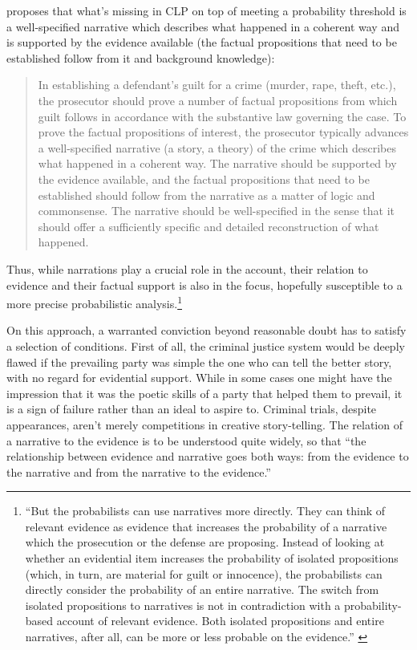 \documentclass[10pt,leqno]{article}
\begin{document}
 \citet{di2013statistics}  proposes that what's  missing in CLP on top of meeting a probability threshold is a well-specified narrative  which describes what happened in a coherent way and is supported by the evidence available (the factual propositions that need to be established follow from it and background knowledge): 
 \begin{quote}
 In establishing a defendant's guilt for a crime (murder, rape, theft, etc.), the prosecutor should prove a number of factual propositions from which guilt follows in accordance with the substantive law governing the case. To prove the factual propositions of interest, the prosecutor typically advances a well-specified narrative (a story, a theory) of the crime which describes what happened in  a coherent way. The narrative should be supported by the evidence available, and the factual propositions that need to be established should follow from the narrative as a matter of logic and commonsense. The narrative should be well-specified in the sense that it should offer a sufficiently specific and detailed reconstruction of what happened.  \citep[24]{di2013statistics}
 \end{quote}
 Thus, while narrations play a crucial role in the account, their relation to evidence and their factual support is also in the focus, hopefully susceptible to a more precise probabilistic  analysis.\footnote{``But the probabilists can use narratives more directly. They can think of relevant evidence as evidence that increases the probability of a narrative which the prosecution or the defense are proposing. Instead of looking at whether an evidential item increases the probability of isolated propositions (which, in turn, are material for guilt or innocence), the probabilists can directly consider the probability of an entire narrative. The switch from isolated propositions to narratives is not in contradiction with a probability-based account of relevant evidence. Both isolated propositions and entire narratives, after all, can be more or less probable on the evidence.'' \citep[192]{di2013statistics}}

 
 On this approach, a warranted conviction beyond reasonable doubt has to satisfy a selection of conditions.  First of all, the criminal justice system would be deeply flawed if the prevailing party was simple the one who can tell the better story, with no regard for evidential support. While in some cases one might have the impression that it was the poetic skills of a party that helped them to prevail, it is a sign of failure rather than an ideal to aspire to. Criminal trials, despite appearances, aren't merely competitions in creative story-telling. The relation of a narrative to the evidence  is to be understood quite widely, so that ``the relationship between evidence and narrative goes both ways: from the evidence to the narrative  and from the narrative to the evidence.'' \citep[208]{di2013statistics}
 
\end{document}
